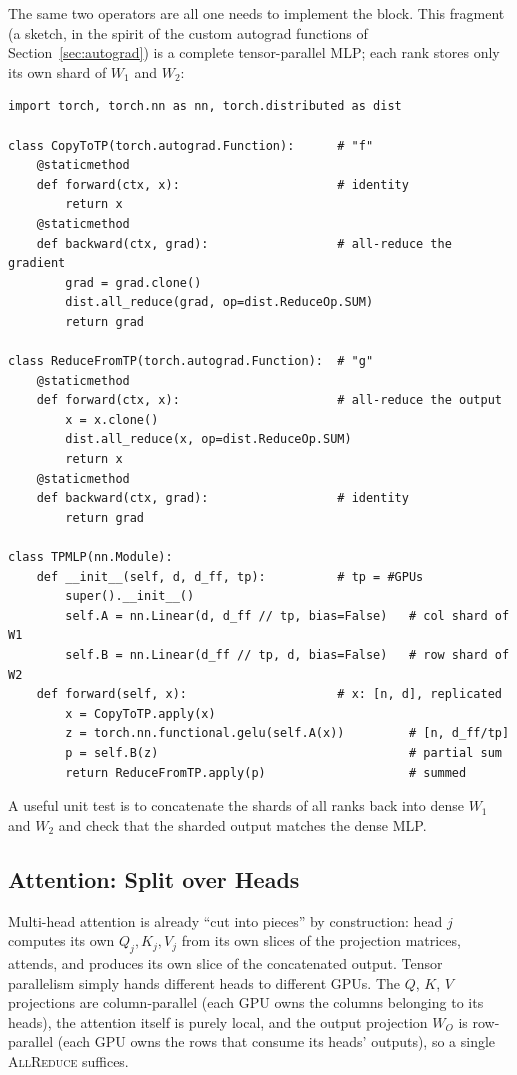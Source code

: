 \documentclass[11pt,a4paper]{article}
\theoremstyle{definition}
\theoremstyle{remark}
\theoremstyle{plain}
\begin{document}
The same two operators are all one needs to implement the block. This
fragment (a sketch, in the spirit of the custom autograd functions of
Section~\ref{sec:autograd}) is a complete tensor-parallel MLP; each rank
stores only its own shard of $W_1$ and $W_2$:

\begin{lstlisting}
import torch, torch.nn as nn, torch.distributed as dist

class CopyToTP(torch.autograd.Function):      # "f"
    @staticmethod
    def forward(ctx, x):                      # identity
        return x
    @staticmethod
    def backward(ctx, grad):                  # all-reduce the gradient
        grad = grad.clone()
        dist.all_reduce(grad, op=dist.ReduceOp.SUM)
        return grad

class ReduceFromTP(torch.autograd.Function):  # "g"
    @staticmethod
    def forward(ctx, x):                      # all-reduce the output
        x = x.clone()
        dist.all_reduce(x, op=dist.ReduceOp.SUM)
        return x
    @staticmethod
    def backward(ctx, grad):                  # identity
        return grad

class TPMLP(nn.Module):
    def __init__(self, d, d_ff, tp):          # tp = #GPUs
        super().__init__()
        self.A = nn.Linear(d, d_ff // tp, bias=False)   # col shard of W1
        self.B = nn.Linear(d_ff // tp, d, bias=False)   # row shard of W2
    def forward(self, x):                     # x: [n, d], replicated
        x = CopyToTP.apply(x)
        z = torch.nn.functional.gelu(self.A(x))         # [n, d_ff/tp]
        p = self.B(z)                                   # partial sum
        return ReduceFromTP.apply(p)                    # summed
\end{lstlisting}

A useful unit test is to concatenate the shards of all ranks back into
dense $W_1$ and $W_2$ and check that the sharded output matches the dense
MLP.

\subsection{Attention: Split over Heads}

Multi-head attention is already ``cut into pieces'' by construction: head
$j$ computes its own $Q_j,K_j,V_j$ from its own slices of the projection
matrices, attends, and produces its own slice of the concatenated output.
Tensor parallelism simply hands different heads to different GPUs. The
$Q$, $K$, $V$ projections are column-parallel (each GPU owns the columns
belonging to its heads), the attention itself is purely local, and the
output projection $W_O$ is row-parallel (each GPU owns the rows that
consume its heads' outputs), so a single \textsc{AllReduce} suffices.
\end{document}
